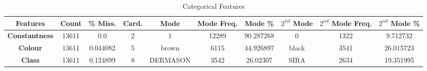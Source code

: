 \documentclass[10pt, conference]{IEEEtran}
\begin{document}
\begin{table}[h!]
    \caption{Categorical Features}
    \begin{center}
    \begin{tabular}{|c||c|c|c|c|c|c|c|c|c|}
        \hline
        \textbf{Features}&\textbf{Count}&\textbf{\% Miss.}&\textbf{Card.}&\textbf{Mode}&\textbf{Mode Freq.}&\textbf{Mode \%}&\textbf{$2^{nd}$ Mode}&\textbf{$2^{nd}$ Mode Freq.}&\textbf{$2^{nd}$ Mode \%}\\
        \hline
        \textbf{Constantness}       &13611  &0.0       &2       &1        &12289      &90.287268     &0          &1322         &9.712732\\
        \textbf{Colour}             &13611  &0.044082  &5       &brown    &6115       &44.926897    &black      &3541          &26.015723\\
        \textbf{Class}              &13611  &0.124899  &8       &DERMASON &3542       &26.02307     &SIRA       &2634          &19.351995\\

        \hline
    \end{tabular}
    \label{categorical features}
    \end{center}
\end{table}
\end{document}
